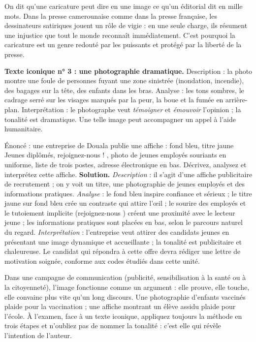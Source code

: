 \documentclass[11pt]{article}
\newcommand{\cle}[1]{{\popxbold\color{popdark}#1}}
\newcounter{popsec}
\newcounter{popsub}
\newcommand{\courssub}[1]{%
  \stepcounter{popsub}%
  \par\vspace{9pt}\noindent{\popxbold\fontsize{11.5}{13}\selectfont\color{popink}{\color{poporange}\thepopsec.\thepopsub}\hspace{6pt}#1}\par\nopagebreak\vspace{4pt}
}
\begin{document}
\begin{savaistu}
On dit qu'une caricature peut dire en une image ce qu'un éditorial dit en mille mots. Dans la presse camerounaise comme dans la presse française, les dessinateurs satiriques jouent un rôle de vigie : en une seule charge, ils résument une injustice que tout le monde reconnaît immédiatement. C'est pourquoi la caricature est un genre redouté par les puissants et protégé par la liberté de la presse.
\end{savaistu}

\textbf{Texte iconique n° 3 : une photographie dramatique.} Description : la photo montre une foule de personnes fuyant une zone sinistrée (inondation, incendie), des bagages sur la tête, des enfants dans les bras. Analyse : les tons sombres, le cadrage serré sur les visages marqués par la peur, la boue et la fumée en arrière-plan. Interprétation : le photographe veut \emph{témoigner} et \emph{émouvoir} l'opinion ; la tonalité est \cle{dramatique}. Une telle image peut accompagner un appel à l'aide humanitaire.

\begin{exoresolu}
Énoncé : une entreprise de Douala publie une affiche : fond bleu, titre jaune \og Jeunes diplômés, rejoignez-nous ! \fg, photo de jeunes employés souriants en uniforme, liste de trois postes, adresse électronique en bas. Décrivez, analysez et interprétez cette affiche.
\tcblower
\textbf{Solution.} \emph{Description} : il s'agit d'une affiche publicitaire de recrutement ; on y voit un titre, une photographie de jeunes employés et des informations pratiques. \emph{Analyse} : le fond bleu inspire confiance et sérieux ; le titre jaune sur fond bleu crée un contraste qui attire l'œil ; le sourire des employés et le tutoiement implicite (\og rejoignez-nous \fg) créent une proximité avec le lecteur jeune ; les informations pratiques sont placées en bas, selon le parcours naturel du regard. \emph{Interprétation} : l'entreprise veut attirer des candidats jeunes en présentant une image dynamique et accueillante ; la tonalité est publicitaire et chaleureuse. Le candidat qui répondra à cette offre devra rédiger une lettre de motivation soignée, conforme aux codes étudiés dans cette unité.
\end{exoresolu}

\courssub{Complément utile au Bac : l'image comme argument}

Dans une campagne de communication (publicité, sensibilisation à la santé ou à la citoyenneté), l'image fonctionne comme un \cle{argument} : elle prouve, elle touche, elle convainc plus vite qu'un long discours. Une photographie d'enfants vaccinés plaide pour la vaccination ; une affiche montrant un élève assidu plaide pour l'école. À l'examen, face à un texte iconique, appliquez toujours la méthode en trois étapes et n'oubliez pas de nommer la tonalité : c'est elle qui révèle l'intention de l'auteur.
\end{document}
